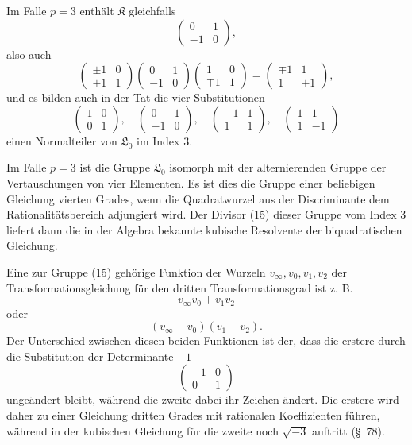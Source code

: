 \documentclass[11pt]{article}
\newcommand{\Lzero}{\mathfrak L_0}
\newcommand{\Kgrp}{\mathfrak K}
\begin{document}
Im Falle $p=3$ enthält $\Kgrp$ gleichfalls
\[
 \begin{pmatrix}0&1\\-1&0\end{pmatrix},
\]
also auch
\[
 \begin{pmatrix}\pm1&0\\\pm1&1\end{pmatrix}
 \begin{pmatrix}0&1\\-1&0\end{pmatrix}
 \begin{pmatrix}1&0\\\mp1&1\end{pmatrix}
 =
 \begin{pmatrix}\mp1&1\\1&\pm1\end{pmatrix},
\]
und es bilden auch in der Tat die vier Substitutionen
\begin{equation}
 \begin{pmatrix}1&0\\0&1\end{pmatrix},
 \quad
 \begin{pmatrix}0&1\\-1&0\end{pmatrix},
 \quad
 \begin{pmatrix}-1&1\\1&1\end{pmatrix},
 \quad
 \begin{pmatrix}1&1\\1&-1\end{pmatrix}
\tag{15}
\end{equation}
einen Normalteiler von $\Lzero$ im Index $3$.

Im Falle $p=3$ ist die Gruppe $\Lzero$ isomorph mit der alternierenden Gruppe der Vertauschungen von vier Elementen. Es ist dies die Gruppe einer beliebigen Gleichung vierten Grades, wenn die Quadratwurzel aus der Discriminante dem Rationalitätsbereich adjungiert wird. Der Divisor (15) dieser Gruppe vom Index $3$ liefert dann die in der Algebra bekannte kubische Resolvente der biquadratischen Gleichung.

Eine zur Gruppe (15) gehörige Funktion der Wurzeln $v_\infty,v_0,v_1,v_2$ der Transformationsgleichung für den dritten Transformationsgrad ist z. B.
\[
 v_\infty v_0+v_1v_2
\]
oder
\[
 (v_\infty-v_0)(v_1-v_2).
\]
Der Unterschied zwischen diesen beiden Funktionen ist der, dass die erstere durch die Substitution der Determinante $-1$
\[
 \begin{pmatrix}-1&0\\0&1\end{pmatrix}
\]
ungeändert bleibt, während die zweite dabei ihr Zeichen ändert. Die erstere wird daher zu einer Gleichung dritten Grades mit rationalen Koeffizienten führen, während in der kubischen Gleichung für die zweite noch $\sqrt{-3}$ auftritt (\S~78).
\end{document}
